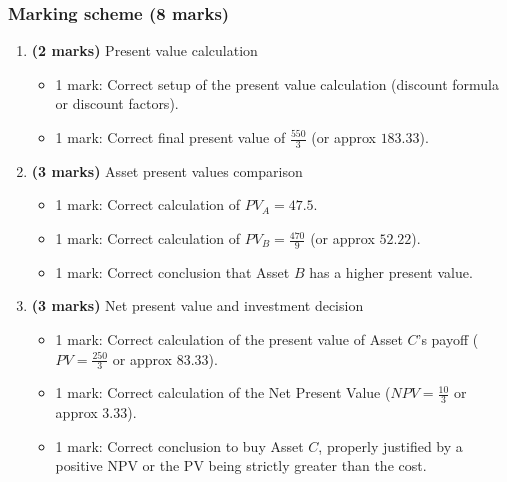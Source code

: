 \documentclass[12pt]{article}
\begin{document}
\vspace{1.5cm}
\newpage
\subsubsection{Marking scheme (8 marks)}

\begin{enumerate}[label=(\alph*)]
\item \textbf{(2 marks)} Present value calculation
\begin{itemize}
\item 1 mark: Correct setup of the present value calculation (discount formula or discount factors).
\item 1 mark: Correct final present value of $\frac{550}{3}$ (or approx $183.33$).
\end{itemize}

\item \textbf{(3 marks)} Asset present values comparison
\begin{itemize}
\item 1 mark: Correct calculation of $PV_A = 47.5$.
\item 1 mark: Correct calculation of $PV_B = \frac{470}{9}$ (or approx $52.22$).
\item 1 mark: Correct conclusion that Asset $B$ has a higher present value.
\end{itemize}

\item \textbf{(3 marks)} Net present value and investment decision
\begin{itemize}
\item 1 mark: Correct calculation of the present value of Asset $C$'s payoff ($PV = \frac{250}{3}$ or approx $83.33$).
\item 1 mark: Correct calculation of the Net Present Value ($NPV = \frac{10}{3}$ or approx $3.33$).
\item 1 mark: Correct conclusion to buy Asset $C$, properly justified by a positive NPV or the PV being strictly greater than the cost.
\end{itemize}
\end{enumerate}

\newpage

\end{document}
